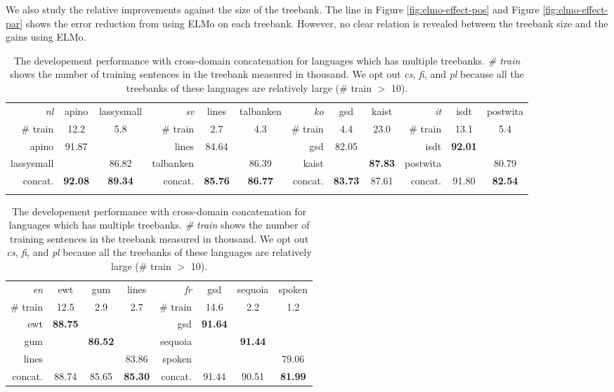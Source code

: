 \documentclass[11pt,a4paper]{article}
\begin{document}
We also study the relative improvements against the size of the treebank.
The line in Figure \ref{fig:elmo-effect-pos} and Figure \ref{fig:elmo-effect-par}
shows the error reduction from using ELMo on each treebank.
However, no clear relation is revealed between the treebank size and the gains using ELMo.
\begin{table}[t]
	\centering
	\small
	\setlength{\tabcolsep}{5pt}
	\begin{tabular}{rcc || rcc || rcc || rcc}
		\textit{nl} & apino & lassysmall & \textit{sv} & lines & talbanken & \textit{ko} & gsd & kaist & \textit{it} & isdt & postwita \\
		\# train & 12.2 & 5.8 & \# train & 2.7 & 4.3 & \# train & 4.4 & 23.0 & \# train & 13.1 & 5.4 \\
		\hline
		apino & 91.87 & & lines & 84.64 & & gsd & 82.05 & & isdt & \textbf{92.01} & \\
		lassysmall & & 86.82 & talbanken & & 86.39 & kaist & & \textbf{87.83} & postwita & & 80.79 \\
		\hline
		concat. & \textbf{92.08} & \textbf{89.34} & concat. & \textbf{85.76} & \textbf{86.77} & concat. & \textbf{83.73} & 87.61 & concat.& 91.80 & \textbf{82.54} \\
		\vspace*{0.5em}
	\end{tabular}
	\begin{tabular}{rccc || rccc}
		\textit{en} & ewt & gum & lines & \textit{fr} & gsd & sequoia & spoken \\
		\# train & 12.5 & 2.9 & 2.7 & \# train & 14.6 & 2.2 & 1.2\\
		\hline
		ewt & \textbf{88.75} & & & gsd & \textbf{91.64} & & \\
		gum & & \textbf{86.52} & & sequoia & & \textbf{91.44} & \\
		lines & & & 83.86 & spoken & & & 79.06 \\
		\hline
		concat. & 88.74 & 85.65 & \textbf{85.30} & concat. & 91.44 & 90.51 & \textbf{81.99} \\
	\end{tabular}
	\caption{The developement performance with cross-domain concatenation for languages which has multiple treebanks.
		\textit{\# train} shows the number of training sentences in the treebank measured in thousand.
		We opt out \textit{cs}, \textit{fi}, and \textit{pl} because all the treebanks of these languages are relatively large (\# train $>$ 10).}\label{tbl:confuse-mat}
\end{table}
\end{document}

